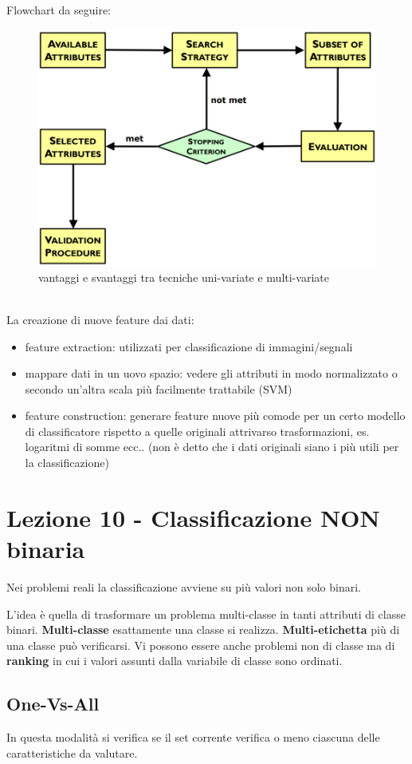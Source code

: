 Flowchart da seguire:
\begin{figure}[h!]
	\centering
	\includegraphics[height=0.45 \linewidth]{classification/pict/feature_flowchart.png}
	\caption{vantaggi e svantaggi tra tecniche uni-variate e multi-variate}
\end{figure}
\\
La creazione di nuove feature dai dati:
\begin{itemize}
	\item feature extraction: utilizzati per classificazione di immagini/segnali
	\item mappare dati in un uovo spazio: vedere gli attributi in modo normalizzato o secondo un'altra scala pi\`u facilmente trattabile (SVM)
	\item feature construction: generare feature nuove pi\`u comode per un certo modello di classificatore rispetto a quelle originali attrivarso trasformazioni, es. logaritmi di somme ecc.. (non \`e detto che i dati originali siano i pi\`u utili per la classificazione)
\end{itemize}

\section{Lezione 10 - Classificazione NON binaria}

Nei problemi reali la classificazione avviene su pi\`u valori non solo binari.

L'idea \`e quella di trasformare un problema multi-classe in tanti attributi di classe binari. \textbf{Multi-classe} esattamente una classe si realizza. \textbf{Multi-etichetta} pi\`u di una classe pu\`o verificarsi. Vi possono essere anche problemi non di classe ma di \textbf{ranking} in cui i valori assunti dalla variabile di classe sono ordinati.

\subsection{One-Vs-All}
In questa modalit\`a si verifica se il set corrente verifica o meno ciascuna delle caratteristiche da valutare. 

